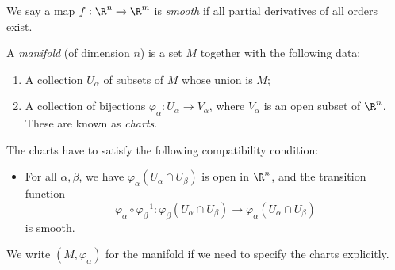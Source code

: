 \documentclass[a4paper]{article}
\begin{document}
\begin{defi}
  We say a map $f:\R^n \to \R^m$ is \emph{smooth} if all partial derivatives of all orders exist.
\end{defi}

\begin{defi}[Manifold]
  A \emph{manifold} (of dimension $n$) is a set $M$ together with the following data:
  \begin{enumerate}
    \item A collection $U_\alpha$ of subsets of $M$ whose union is $M$;
    \item A collection of bijections $\varphi_\alpha: U_\alpha \to V_\alpha$, where $V_\alpha$ is an open subset of $\R^n$. These are known as \emph{charts}.
  \end{enumerate}
  The charts have to satisfy the following compatibility condition:
  \begin{itemize}
    \item For all $\alpha, \beta$, we have $\varphi_\alpha(U_\alpha \cap U_\beta)$ is open in $\R^n$, and the transition function
      \[
        \varphi_\alpha \circ \varphi_\beta^{-1}: \varphi_\beta(U_\alpha \cap U_\beta) \to \varphi_\alpha(U_\alpha \cap U_\beta)
      \]
      is smooth.
  \end{itemize}
  We write $(M, \varphi_\alpha)$ for the manifold if we need to specify the charts explicitly.
  \begin{center}
\end{center}
\end{defi}
\end{document}
